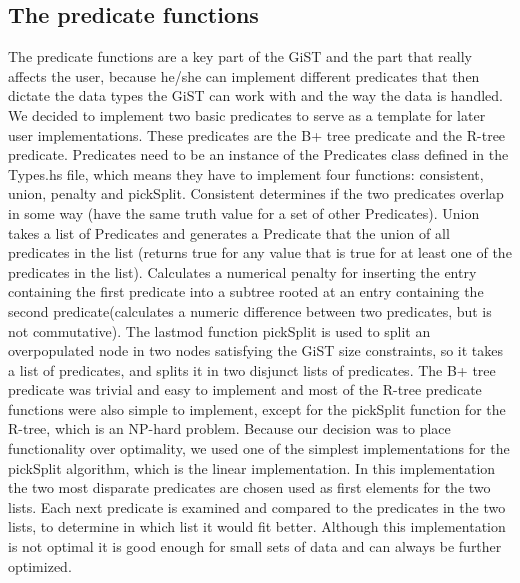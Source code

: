 \documentclass{scrartcl}
\begin{document}
\subsection{The predicate functions}
The predicate functions are a key part of the GiST and the part that really affects the user, because he/she can implement different predicates that then dictate the data types the GiST can work with 
and the way the data is handled. We decided to implement two basic predicates to serve as a template for later user implementations. These predicates are the B+ tree predicate and the R-tree predicate.
Predicates need to be an instance of the Predicates class defined in the Types.hs file, which means they have to implement four functions: consistent, union, penalty and pickSplit. Consistent determines
if the two predicates overlap in some way (have the same truth value for a set of other Predicates). Union takes a list of Predicates and generates a Predicate that the union of all predicates in the list
(returns true for any value that is true for at least one of the predicates in the list). Calculates a numerical penalty for inserting the entry containing the first predicate into a subtree rooted at an 
entry containing the second predicate(calculates a numeric difference between two predicates, but is not commutative). The lastmod function pickSplit is used to split an overpopulated node in two nodes satisfying
the GiST size constraints, so it takes a list of predicates, and splits it in two disjunct lists of predicates. The B+ tree predicate was trivial and easy to implement and most of the R-tree predicate functions were
also simple to implement, except for the pickSplit function for the R-tree, which is an NP-hard problem. Because our decision was to place functionality over optimality, we used one of the simplest implementations
for the pickSplit algorithm, which is the linear implementation. In this implementation the two most disparate predicates are chosen used as first elements for the two lists. Each next predicate is examined and compared
to the predicates in the two lists, to determine in which list it would fit better. Although this implementation is not optimal it is good enough for small sets of data and can always be further optimized.
\end{document}
